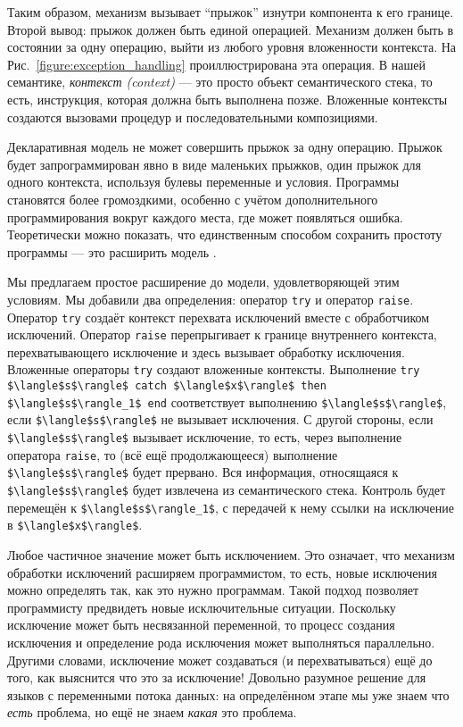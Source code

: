 Таким образом, механизм вызывает ``прыжок'' изнутри компонента к его границе. Второй вывод: прыжок должен быть единой операцией. Механизм должен быть в состоянии за одну операцию, выйти из любого уровня вложенности контекста. На Рис.~\ref{figure:exception_handling} проиллюстрирована эта операция. В нашей семантике, \emph{контекст (context)} --- это просто объект семантического стека, то есть, инструкция, которая должна быть выполнена позже. Вложенные контексты создаются вызовами процедур и последовательными композициями.

Декларативная модель не может совершить прыжок за одну операцию. Прыжок будет запрограммирован явно в виде маленьких прыжков, один прыжок для одного контекста, используя булевы переменные и условия. Программы становятся более громоздкими, особенно с учётом дополнительного программирования вокруг каждого места, где может появляться ошибка. Теоретически можно показать, что единственным способом сохранить простоту программы --- это расширить модель \cite{103, 105}.

Мы предлагаем простое расширение до модели, удовлетворяющей этим условиям. Мы добавили два определения: оператор \lstinline|try| и оператор \lstinline|raise|. Оператор \lstinline|try| создаёт контекст перехвата исключений вместе с обработчиком исключений. Оператор \lstinline|raise| перепрыгивает к границе внутреннего контекста, перехватывающего исключение и здесь вызывает обработку исключения. Вложенные операторы \lstinline|try| создают вложенные контексты. Выполнение \lstinline|try $\langle$s$\rangle$ catch $\langle$x$\rangle$ then $\langle$s$\rangle_1$ end| соответствует выполнению \lstinline|$\langle$s$\rangle$|, если \lstinline|$\langle$s$\rangle$| не вызывает исключения. С другой стороны, если \lstinline|$\langle$s$\rangle$| вызывает исключение, то есть, через выполнение оператора \lstinline|raise|, то (всё ещё продолжающееся) выполнение \lstinline|$\langle$s$\rangle$| будет прервано. Вся информация, относящаяся к \lstinline|$\langle$s$\rangle$| будет извлечена из семантического стека. Контроль будет перемещён к \lstinline|$\langle$s$\rangle_1$|, с передачей к нему ссылки на исключение в \lstinline|$\langle$x$\rangle$|.

Любое частичное значение может быть исключением. Это означает, что механизм обработки исключений расширяем программистом, то есть, новые исключения можно определять так, как это нужно программам. Такой подход позволяет программисту предвидеть новые исключительные ситуации. Поскольку исключение может быть несвязанной переменной, то процесс создания исключения и определение рода исключения может выполняться параллельно. Другими словами, исключение может создаваться (и перехватываться) ещё до того, как выяснится что это за исключение! Довольно разумное решение для языков с переменными потока данных: на определённом этапе мы уже знаем что \emph{есть} проблема, но ещё не знаем \emph{какая} это проблема.

